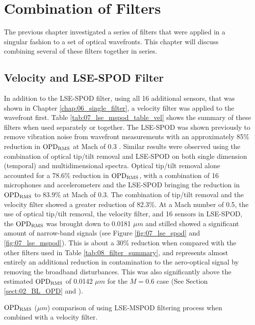 
\chapter{Combination of Filters}
\label{chap:07_multiple_filter}

The previous chapter investigated a series of filters that were applied in a singular fashion to a set of optical wavefronts.
This chapter will discuss combining several of these filters together in series.


\section{Velocity and LSE-SPOD Filter}
In addition to the LSE-SPOD filter, using all 16 additional sensors, that was shown in Chapter \ref{chap:06_single_filter}, a velocity filter was applied to the wavefront first.
Table \ref{tab:07_lse_mspod_table_vel} shows the summary of these filters when used separately or together.
The LSE-SPOD was shown previously to remove vibration noise from wavefront measurements with an approximately 85\% reduction in $\operatorname{OPD_{RMS}}$ at Mach of 0.3 \cite{DeLucca-2014-RAJvGdv7}.
Similar results were observed using the combination of optical tip/tilt removal and LSE-SPOD on both single dimension (temporal) and multidimensional spectra.
Optical tip/tilt removal alone accounted for a 78.6\% reduction in $\operatorname{OPD_{RMS}}$, with a combination of 16 microphones and accelerometers and the LSE-SPOD bringing the reduction in $\operatorname{OPD_{RMS}}$ to 83.9\% at Mach of 0.3.
The combination of tip/tilt removal and the velocity filter showed a greater reduction of 82.3\%.
At a Mach number of 0.5, the use of optical tip/tilt removal, the velocity filter, and 16 sensors in LSE-SPOD, the $\operatorname{OPD_{RMS}}$ was brought down to 0.0181 $\mu m$ and stilled showed a significant amount of narrow-band signals (see Figure \ref{fig:07_lse_spod} and \ref{fig:07_lse_mspod}).
This is about a 30\% reduction when compared with the other filters used in Table \ref{tab:08_filter_summary}, and represents almost entirely an additional reduction in contamination to the aero-optical signal by removing the broadband disturbances.
This was also significantly above the estimated $\operatorname{OPD_{RMS}}$ of 0.0142 $\mu m$ for the $M=0.6$ case (See Section \ref{sect:02_BL_OPD} and \cite{Gordeyev-2014-jcJndkHM}).
\begin{table}
  \centering
  \caption{$\operatorname{OPD_{RMS}}$ ($\mu m$) comparison of using LSE-MSPOD filtering process when combined with a velocity filter.}
  
  \label{tab:07_lse_mspod_table_vel}
\end{table}

